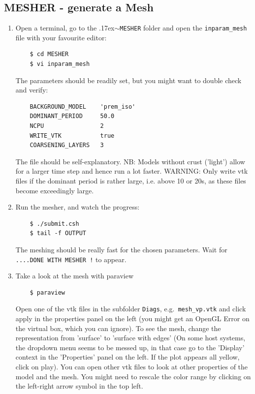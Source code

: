 \documentclass{article}
\newcommand{\ttilde}[0]{\raise.17ex\hbox{$\scriptstyle\sim$}}
\begin{document}
\subsection{MESHER - generate a Mesh}

\begin{enumerate}
    \item Open a terminal, go to the \ttilde\verb|MESHER| folder and open
    the \verb|inparam_mesh| file with your favourite editor:
    \begin{verbatim}
    $ cd MESHER
    $ vi inparam_mesh
    \end{verbatim}
    The parameters should be readily set, but you might want to double check and verify:
    \begin{verbatim}
    BACKGROUND_MODEL    'prem_iso'
    DOMINANT_PERIOD     50.0
    NCPU                2
    WRITE_VTK           true
    COARSENING_LAYERS   3
    \end{verbatim}
    The file should be self-explanatory. NB: Models without crust ('light') allow for a
    larger time step and hence run a lot faster. WARNING: Only write
    vtk files if the dominant period is rather large, i.e. above 10 or
    20s, as these files become exceedingly large.

    \item Run the mesher, and watch the progress:
    \begin{verbatim}
    $ ./submit.csh
    $ tail -f OUTPUT
    \end{verbatim}
    The meshing should be really fast for the chosen parameters. Wait for 
    \verb|....DONE WITH MESHER !| to appear.

    \item Take a look at the mesh with paraview
    \begin{verbatim}
    $ paraview
    \end{verbatim}
    Open one of the vtk files in the subfolder \verb|Diags|, e.g.\
    \verb|mesh_vp.vtk| and click apply in the properties panel on the left (you
    might get an OpenGL Error on the virtual box, which you can ignore). To see
    the mesh, change the representation from 'surface' to 'surface with edges'
    (On some host systems, the dropdown menu seems to be messed up, in that
    case go to the 'Display' context in the 'Properties' panel on the left. If
    the plot appears all yellow, click on play).  You can open other vtk files
    to look at other properties of the model and the mesh. You might need to
    rescale the color range by clicking on the left-right arrow symbol in the
    top left.


\end{enumerate}
\end{document}
